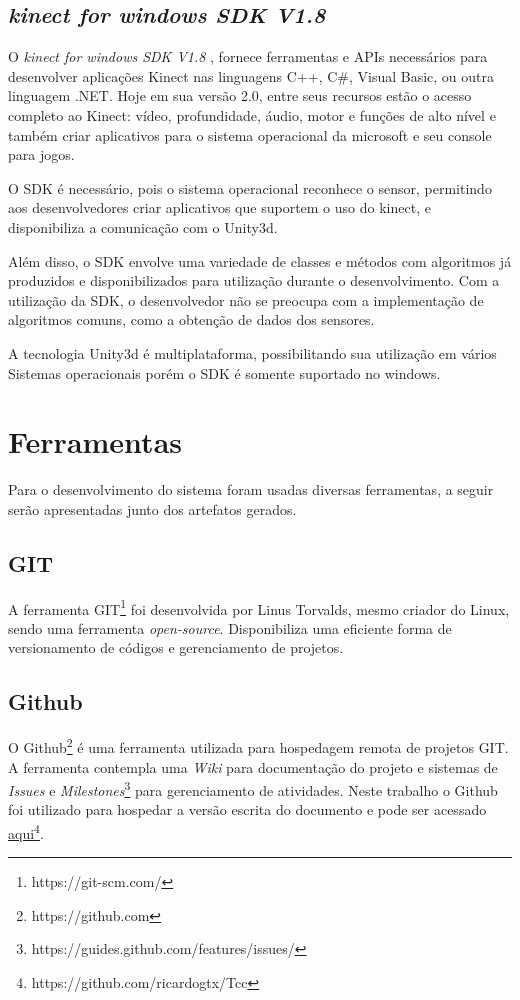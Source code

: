     \subsection{\textit{kinect for windows SDK V1.8 }}\label{sub:sdk}
      O \textit{kinect for windows SDK V1.8 }, fornece ferramentas e APIs necessários para desenvolver
    aplicações Kinect nas linguagens  C++, C\#, Visual Basic, ou outra linguagem .NET. Hoje em sua versão 2.0,
    entre seus recursos estão o acesso completo ao Kinect: vídeo,
    profundidade, áudio, motor e funções de alto nível e também  criar aplicativos
    para o sistema operacional da microsoft e seu console para jogos.

     O SDK é necessário, pois o sistema operacional reconhece o sensor, permitindo aos
     desenvolvedores criar aplicativos que suportem o uso do kinect, e disponibiliza a comunicação com o Unity3d.

      Além disso, o SDK envolve uma variedade
    de classes e métodos com algoritmos já produzidos e disponibilizados para utilização
    durante o desenvolvimento. Com a utilização da SDK, o desenvolvedor não se preocupa
    com a implementação de algoritmos comuns, como a obtenção de dados dos
    sensores.

    A tecnologia Unity3d é multiplataforma, possibilitando sua utilização em vários Sistemas operacionais
    porém o SDK é somente suportado no windows.

    \section{Ferramentas}\label{sub:solFerramentas}
      Para o desenvolvimento do sistema foram usadas diversas ferramentas, a seguir serão apresentadas junto
    dos artefatos gerados.

    \subsection{GIT}\label{sub:git}
      A ferramenta GIT\footnote{https://git-scm.com/} foi desenvolvida por Linus Torvalds, mesmo criador do Linux,
    sendo uma ferramenta \textit{open-source}. Disponibiliza uma eficiente forma de versionamento de códigos e
    gerenciamento de projetos.

    \subsection{Github}\label{sub:github}
      O Github\footnote{https://github.com} é uma ferramenta utilizada para hospedagem remota de projetos GIT.
      A ferramenta contempla uma \textit{Wiki} para documentação do projeto e sistemas de \textit{Issues} e
      \textit{Milestones}\footnote{https://guides.github.com/features/issues/} para gerenciamento de atividades.
    Neste trabalho o Github foi utilizado para hospedar a versão escrita do documento e pode ser acessado \href{https://github.com/ricardogtx/Tcc}{aqui}\footnote{https://github.com/ricardogtx/Tcc}.

